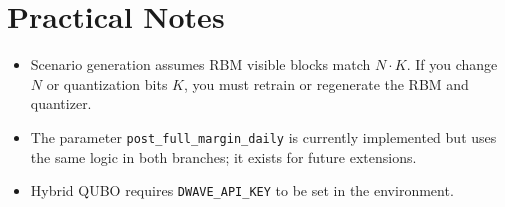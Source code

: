 \documentclass[11pt]{article}
\begin{document}
\section{Practical Notes}
\begin{itemize}[leftmargin=*]
  \item Scenario generation assumes RBM visible blocks match $N \cdot K$.
  If you change $N$ or quantization bits $K$, you must retrain or regenerate
  the RBM and quantizer.
  \item The parameter \texttt{post\_full\_margin\_daily} is currently implemented
  but uses the same logic in both branches; it exists for future extensions.
  \item Hybrid QUBO requires \texttt{DWAVE\_API\_KEY} to be set in the environment.
\end{itemize}
\end{document}

